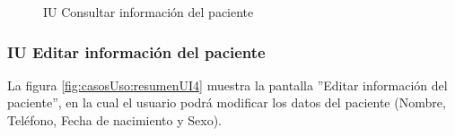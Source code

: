 \begin{figure}[htpb!]
	\begin{center}
		\caption{IU Consultar información del paciente \label{fig:casosUso:resumenUI3}}
	\end{center}
\end{figure}


\subsubsection{IU Editar información del paciente}
La figura \ref{fig:casosUso:resumenUI4} muestra la pantalla ''Editar información del paciente'', en la cual el usuario podrá modificar los datos del paciente (Nombre, Teléfono, Fecha de nacimiento y Sexo).

